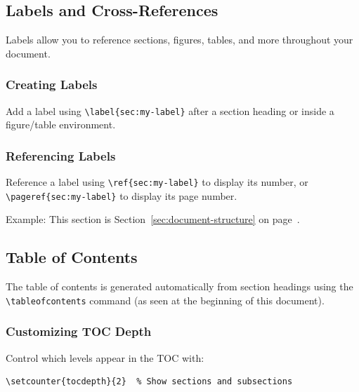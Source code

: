 \subsection{Labels and Cross-References}\label{subsec:labels-cross-refs}
Labels allow you to reference sections, figures, tables, and more throughout your document.

\subsubsection{Creating Labels}\label{subsubsec:creating-labels}
Add a label using \verb|\label{sec:my-label}| after a section heading or inside a figure/table environment.

\subsubsection{Referencing Labels}\label{subsubsec:referencing-labels}
Reference a label using \verb|\ref{sec:my-label}| to display its number, or \verb|\pageref{sec:my-label}| to display its page number.

Example: This section is Section~\ref{sec:document-structure} on page~\pageref{sec:document-structure}.

\subsection{Table of Contents}\label{subsec:table-of-contents}
The table of contents is generated automatically from section headings using the \verb|\tableofcontents| command (as seen at the beginning of this document).

\subsubsection{Customizing TOC Depth}\label{subsubsec:toc-depth}
Control which levels appear in the TOC with:
\begin{verbatim}
\setcounter{tocdepth}{2}  % Show sections and subsections
\end{verbatim}